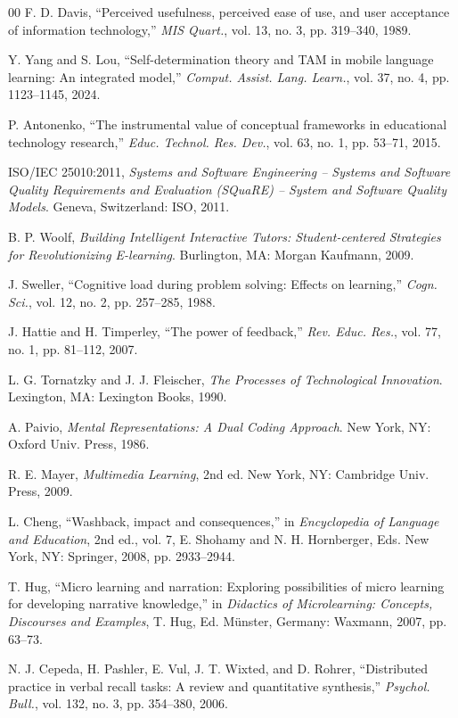 \documentclass[11pt,a4paper]{article}
\begin{document}
\begin{thebibliography}{00}
F. D. Davis, ``Perceived usefulness, perceived ease of use, and user acceptance of information technology,'' \textit{MIS Quart.}, vol. 13, no. 3, pp. 319--340, 1989.

Y. Yang and S. Lou, ``Self-determination theory and TAM in mobile language learning: An integrated model,'' \textit{Comput. Assist. Lang. Learn.}, vol. 37, no. 4, pp. 1123--1145, 2024.

P. Antonenko, ``The instrumental value of conceptual frameworks in educational technology research,'' \textit{Educ. Technol. Res. Dev.}, vol. 63, no. 1, pp. 53--71, 2015.

ISO/IEC 25010:2011, \textit{Systems and Software Engineering -- Systems and Software Quality Requirements and Evaluation (SQuaRE) -- System and Software Quality Models}. Geneva, Switzerland: ISO, 2011.

B. P. Woolf, \textit{Building Intelligent Interactive Tutors: Student-centered Strategies for Revolutionizing E-learning}. Burlington, MA: Morgan Kaufmann, 2009.

J. Sweller, ``Cognitive load during problem solving: Effects on learning,'' \textit{Cogn. Sci.}, vol. 12, no. 2, pp. 257--285, 1988.

J. Hattie and H. Timperley, ``The power of feedback,'' \textit{Rev. Educ. Res.}, vol. 77, no. 1, pp. 81--112, 2007.

L. G. Tornatzky and J. J. Fleischer, \textit{The Processes of Technological Innovation}. Lexington, MA: Lexington Books, 1990.

A. Paivio, \textit{Mental Representations: A Dual Coding Approach}. New York, NY: Oxford Univ. Press, 1986.

R. E. Mayer, \textit{Multimedia Learning}, 2nd ed. New York, NY: Cambridge Univ. Press, 2009.

L. Cheng, ``Washback, impact and consequences,'' in \textit{Encyclopedia of Language and Education}, 2nd ed., vol. 7, E. Shohamy and N. H. Hornberger, Eds. New York, NY: Springer, 2008, pp. 2933--2944.

T. Hug, ``Micro learning and narration: Exploring possibilities of micro learning for developing narrative knowledge,'' in \textit{Didactics of Microlearning: Concepts, Discourses and Examples}, T. Hug, Ed. Münster, Germany: Waxmann, 2007, pp. 63--73.

N. J. Cepeda, H. Pashler, E. Vul, J. T. Wixted, and D. Rohrer, ``Distributed practice in verbal recall tasks: A review and quantitative synthesis,'' \textit{Psychol. Bull.}, vol. 132, no. 3, pp. 354--380, 2006.


\end{thebibliography}
\end{document}
